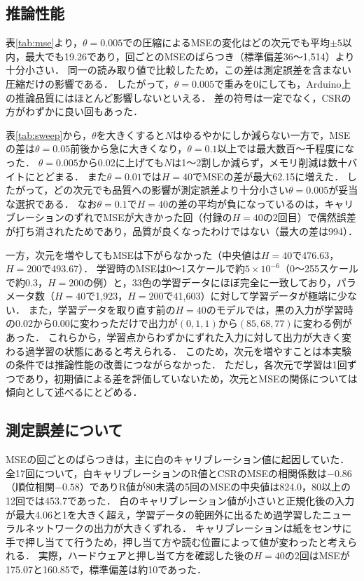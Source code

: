 \documentclass[a4paper,11pt,uplatex,dvipdfmx]{jsarticle}
\begin{document}
\subsection{推論性能}
表\ref{tab:mse}より，$\theta=0.005$での圧縮によるMSEの変化はどの次元でも平均$\pm 5$以内，最大でも19.26であり，回ごとのMSEのばらつき（標準偏差36〜1{,}514）より十分小さい．
同一の読み取り値で比較したため，この差は測定誤差を含まない圧縮だけの影響である．
したがって，$\theta=0.005$で重みを0にしても，Arduino上の推論品質にはほとんど影響しないといえる．
差の符号は一定でなく，CSRの方がわずかに良い回もあった．

表\ref{tab:sweep}から，$\theta$を大きくすると$N$はゆるやかにしか減らない一方で，MSEの差は$\theta=0.05$前後から急に大きくなり，$\theta=0.1$以上では最大数百〜千程度になった．
$\theta=0.005$から0.02に上げても$N$は1〜2割しか減らず，メモリ削減は数十バイトにとどまる．
また$\theta=0.01$では$H=40$でMSEの差が最大62.15に増えた．
したがって，どの次元でも品質への影響が測定誤差より十分小さい$\theta=0.005$が妥当な選択である．
なお$\theta=0.1$で$H=40$の差の平均が負になっているのは，キャリブレーションのずれでMSEが大きかった回（付録の$H=40$の2回目）で偶然誤差が打ち消されたためであり，品質が良くなったわけではない（最大の差は994）．

一方，次元を増やしてもMSEは下がらなかった（中央値は$H=40$で476.63，$H=200$で493.67）．
学習時のMSEは0〜1スケールで約$5\times10^{-6}$（0〜255スケールで約0.3，$H=200$の例）と，33色の学習データにほぼ完全に一致しており，パラメータ数（$H=40$で1{,}923，$H=200$で41{,}603）に対して学習データが極端に少ない．
また，学習データを取り直す前の$H=40$のモデルでは，黒の入力が学習時の0.02から0.00に変わっただけで出力が$(0,1,1)$から$(85,68,77)$に変わる例があった．
これらから，学習点からわずかにずれた入力に対して出力が大きく変わる過学習の状態にあると考えられる．
このため，次元を増やすことは本実験の条件では推論性能の改善につながらなかった．
ただし，各次元で学習は1回ずつであり，初期値による差を評価していないため，次元とMSEの関係については傾向として述べるにとどめる．

\subsection{測定誤差について}
MSEの回ごとのばらつきは，主に白のキャリブレーション値に起因していた．
全17回について，白キャリブレーションのR値とCSRのMSEの相関係数は$-0.86$（順位相関$-0.58$）でありR値が80未満の5回のMSEの中央値は824.0，80以上の12回では453.7であった．
白のキャリブレーション値が小さいと正規化後の入力が最大4.06と1を大きく超え，学習データの範囲外に出るため過学習したニューラルネットワークの出力が大きくずれる．
キャリブレーションは紙をセンサに手で押し当てて行うため，押し当て方や読む位置によって値が変わったと考えられる．
実際，ハードウェアと押し当て方を確認した後の$H=40$の2回はMSEが175.07と160.85で，標準偏差は約10であった．
\end{document}
